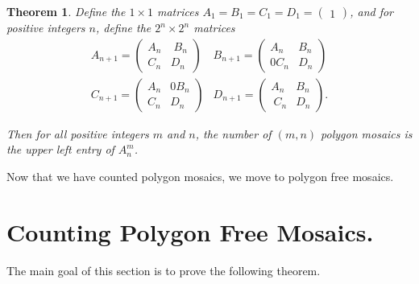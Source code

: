 \documentclass[12pt]{article}
\theoremstyle{plain}
\newtheorem{thm}{Theorem}[section]
\theoremstyle{remark}
\theoremstyle{definition}
\theoremstyle{remark}
\theoremstyle{definition}
\begin{document}
\begin{thm}
Define the $1 \times 1$ matrices $A_{1}=B_{1}=C_{1}=D_{1}=\begin{pmatrix}1\end{pmatrix}$, and for positive integers $n$, define the $2^{n} \times 2^{n}$ matrices
\begin{eqnarray*}
A_{n+1} = \begin{pmatrix} A_{n} & \; B_{n} \\ C_{n} & D_{n} \end{pmatrix} & B_{n+1} = \begin{pmatrix} A_{n} & B_{n} \\ 0C_{n} & D_{n} \end{pmatrix} \\
C_{n+1} = \begin{pmatrix} A_{n} & 0B_{n} \\ C_{n} & D_{n} \end{pmatrix} & D_{n+1} = \begin{pmatrix} A_{n} & B_{n} \\ \: C_{n} & D_{n} \end{pmatrix}.
\end{eqnarray*}

\noindent Then for all positive integers $m$ and $n$, the number of $(m,n)$ polygon mosaics is the upper left entry of $A_{n}^m$.
\label{thm: polygon mosaic summation final}
\end{thm}

Now that we have counted polygon mosaics, we move to polygon free mosaics.

\section{Counting Polygon Free Mosaics.}\label{section: counting polygon free mosaics}

The main goal of this section is to prove the following theorem.
\end{document}
